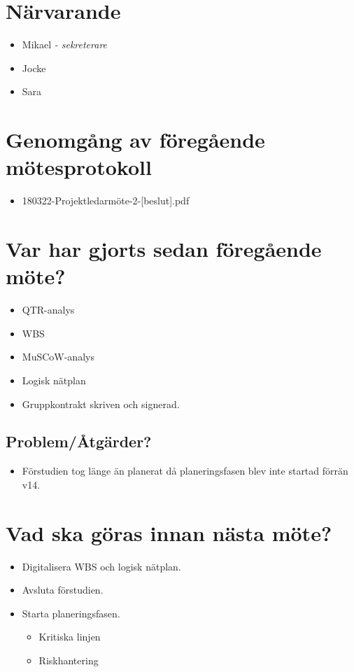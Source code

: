 
\section*{Närvarande}
\begin{itemize}[noitemsep]
    \item Mikael \textit{- sekreterare}
    \item Jocke
    \item Sara
\end{itemize}

\section*{Genomgång av föregående mötesprotokoll}
\begin{itemize}[noitemsep]
    \item 180322-Projektledarmöte-2-[beslut].pdf
\end{itemize}

\section*{Var har gjorts sedan föregående möte?}
\begin{itemize}[noitemsep]
    \item QTR-analys
    \item WBS
    \item MuSCoW-analys
    \item Logisk nätplan
    \item Gruppkontrakt skriven och signerad.
\end{itemize}

\subsection*{Problem/Åtgärder?}
\begin{itemize}[noitemsep]
    \item Förstudien tog länge än planerat då planeringsfasen blev inte startad förrän v14.
\end{itemize}

\section*{Vad ska göras innan nästa möte?}
\begin{itemize}[noitemsep]
    \item Digitalisera WBS och logisk nätplan.
    \item Avsluta förstudien.
    \item Starta planeringsfasen.
    \begin{itemize}[noitemsep]
        \item Kritiska linjen
        \item Riskhantering
    \end{itemize}
\end{itemize}

